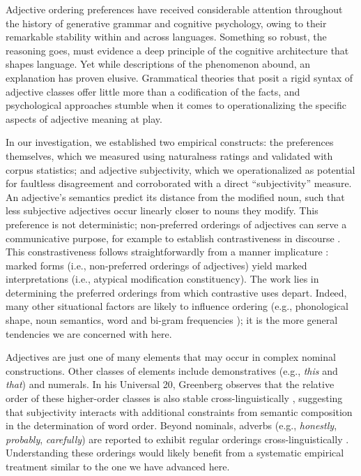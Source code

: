 \documentclass{pnastwo}
\newcommand{\ndg}[1]{\textcolor{Green}{[ndg: #1]}}
\begin{document}
\begin{article}
Adjective ordering preferences have received considerable attention throughout the history of generative grammar and cognitive psychology, owing to their remarkable stability within and across languages. Something so robust, the reasoning goes, must evidence a deep principle of the cognitive architecture that shapes language. Yet while descriptions of the phenomenon abound, an explanation has proven elusive. Grammatical theories that posit a rigid syntax of adjective classes offer little more than a codification of the facts, and psychological approaches stumble when it comes to operationalizing the specific aspects of adjective meaning at play. 

In our investigation, we established two empirical constructs: the preferences themselves, which we measured using naturalness ratings and validated with corpus statistics; and adjective subjectivity, which we operationalized as potential for faultless disagreement and corroborated with a direct ``subjectivity'' measure. 
An adjective's semantics predict its distance from the modified noun, such that less subjective adjectives occur linearly closer to nouns they modify. 
This preference is not deterministic; non-preferred orderings of adjectives can serve a communicative purpose, for example to establish contrastiveness in discourse \cite{martin1969determinants,martin1970juncture,hill1960,vendler1963}. This constrastiveness follows straightforwardly from a manner implicature \cite{levinson2000}: marked forms (i.e., non-preferred orderings of adjectives) yield marked interpretations (i.e., atypical modification constituency). The work lies in determining the preferred orderings from which  contrastive uses depart. Indeed, many other situational factors are likely to influence ordering (e.g., phonological shape, noun semantics, word and bi-gram frequencies \cite{wulff2003}); it is the more general tendencies we are concerned with here.

Adjectives are just one of many elements that may occur in complex nominal constructions. Other classes of elements include demonstratives (e.g., \emph{this} and \emph{that}) and numerals. In his Universal 20, Greenberg observes that the relative order of these higher-order classes is also stable cross-linguistically \cite{greenberg1963,culbertsonadger2014}, suggesting that subjectivity interacts with additional constraints from semantic composition in the determination of word order. Beyond nominals, adverbs (e.g., \emph{honestly}, \emph{probably}, \emph{carefully}) are reported to exhibit regular orderings cross-linguistically \cite{cinque1999,ernst2002}. Understanding these orderings would likely benefit from a systematic empirical treatment similar to the one we have advanced here.



\end{article}
\end{document}
